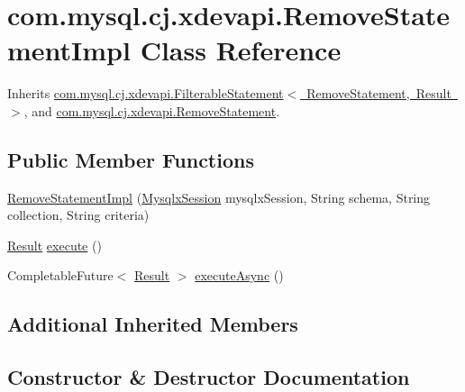 \hypertarget{classcom_1_1mysql_1_1cj_1_1xdevapi_1_1_remove_statement_impl}{}\section{com.\+mysql.\+cj.\+xdevapi.\+Remove\+Statement\+Impl Class Reference}
\label{classcom_1_1mysql_1_1cj_1_1xdevapi_1_1_remove_statement_impl}


Inherits \mbox{\hyperlink{classcom_1_1mysql_1_1cj_1_1xdevapi_1_1_filterable_statement}{com.\+mysql.\+cj.\+xdevapi.\+Filterable\+Statement$<$ Remove\+Statement, Result $>$}}, and \mbox{\hyperlink{interfacecom_1_1mysql_1_1cj_1_1xdevapi_1_1_remove_statement}{com.\+mysql.\+cj.\+xdevapi.\+Remove\+Statement}}.

\subsection*{Public Member Functions}
\begin{DoxyCompactItemize}
\item 
\mbox{\hyperlink{classcom_1_1mysql_1_1cj_1_1xdevapi_1_1_remove_statement_impl_a0e5e4d0e84f24a40869bc4034d64c7b7}{Remove\+Statement\+Impl}} (\mbox{\hyperlink{classcom_1_1mysql_1_1cj_1_1_mysqlx_session}{Mysqlx\+Session}} mysqlx\+Session, String schema, String collection, String criteria)
\item 
\mbox{\hyperlink{interfacecom_1_1mysql_1_1cj_1_1xdevapi_1_1_result}{Result}} \mbox{\hyperlink{classcom_1_1mysql_1_1cj_1_1xdevapi_1_1_remove_statement_impl_aa364f7ecdcdf0a105229018ffe0bcc31}{execute}} ()
\item 
Completable\+Future$<$ \mbox{\hyperlink{interfacecom_1_1mysql_1_1cj_1_1xdevapi_1_1_result}{Result}} $>$ \mbox{\hyperlink{classcom_1_1mysql_1_1cj_1_1xdevapi_1_1_remove_statement_impl_a3f4fc42cc10759bca1c9221d132a6858}{execute\+Async}} ()
\end{DoxyCompactItemize}
\subsection*{Additional Inherited Members}


\subsection{Constructor \& Destructor Documentation}
\mbox{\label{classcom_1_1mysql_1_1cj_1_1xdevapi_1_1_remove_statement_impl_a0e5e4d0e84f24a40869bc4034d64c7b7}} 
